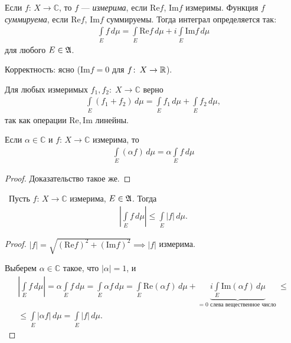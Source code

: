 \begin{df}
 Если  $f \colon\, X \to \mathbb{C} $, то $f$ --- \textit{измерима}, если $\mathrm{Re} f$,  $\mathrm{Im} f$ измеримы. Функция  $f$ \textit{суммируема}, если $\mathrm{Re} f$,  $\mathrm{Im} f$ суммируемы. Тогда интеграл определяется так: \begin{align*}
  \int\limits_E f \, d\mu = \int\limits_E \mathrm{Re} f \, d\mu + i \int\limits_E \mathrm{Im} f \,d\mu
 \end{align*} для любого $E \in \mathfrak{A}$.

 Корректность: ясно ($\mathrm{Im} f = 0$ для  $f \colon\, X \to \mathbb{R}  $).
\end{df}
\begin{remrk}
 Для любых измеримых $f_1, f_2 \colon\; X \to \mathbb{C}$ верно
 \begin{align*}
  \int\limits_E (f_1 + f_2) \, d\mu = \int\limits_E f_1 \,d\mu + \int\limits_E f_2 \,d\mu
 ,\end{align*}  так как операции $\mathrm{Re}, \mathrm{Im}$ линейны.
\end{remrk}
\begin{claim}
 Если $\alpha \in \mathbb{C}$ и $f \colon\, X \to \mathbb{C} $ измерима, то \begin{align*}
  \int\limits_E (\alpha f) \, d\mu = \alpha \int\limits_E f\,d\mu
 \end{align*} 
\end{claim}
\begin{proof}
 Доказательство такое же.
\end{proof}
\begin{claim}\
 Пусть $f \colon\, X \to \mathbb{C} $ измерима, $E \in \mathfrak{A}$. Тогда \begin{align*}
  \left| \int\limits_E f \, d\mu \right| \leqslant \int\limits_E \left| f \right| \,d\mu
 .\end{align*} 
\end{claim}
\begin{proof}
 $\left| f \right| = \sqrt{(\mathrm{Re} f)^{2} + (\mathrm{Im} f)^{2}} \implies \left| f \right| $ измерима.

 Выберем $\alpha \in \mathbb{C}$ такое, что $\left| \alpha \right| = 1$, и \begin{align*}
  \left| \int\limits_E f\,d\mu \right| = \alpha \int\limits_E f\,d\mu = \int\limits_E \alpha f \,d\mu = \int\limits_E \mathrm{Re}(\alpha f) \,d\mu + \underbrace{i \int\limits_E \mathrm{Im}(\alpha f) \, d\mu}_{= 0 \text{ слева вещественное число }} \leqslant \\ \leqslant \int\limits_E \left| \alpha f \right| \,d\mu = \int\limits_E \left| f \right| \,d\mu
 .\end{align*} 
\end{proof}
